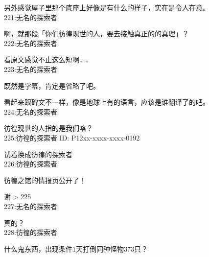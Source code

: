 另外感觉屋子里那个底座上好像是有什么的样子，实在是令人在意。\\

221:无名的探索者

啊，就那段「你们彷徨现世的人，要去接触真正的的真理」？\\

222:无名的探索者

看原文感觉不止这么短啊……\\

223:无名的探索者

既然是字幕，肯定是省略了吧。

看起来跟碑文不一样，像是地球上有的语言，应该是谁翻译了的吧。\\

224:无名的探索者

彷徨现世的人指的是我们咯？\\

225:彷徨的探索者 ID: P12xx-xxxx-xxxx-0192

试着换成彷徨的探索者\\

226:彷徨的探索者

彷徨之馆的情报页公开了！

谢 > 225\\

227:无名的探索者

真的？\\

228:彷徨的探索者

什么鬼东西，出现条件1天打倒同种怪物373只？

